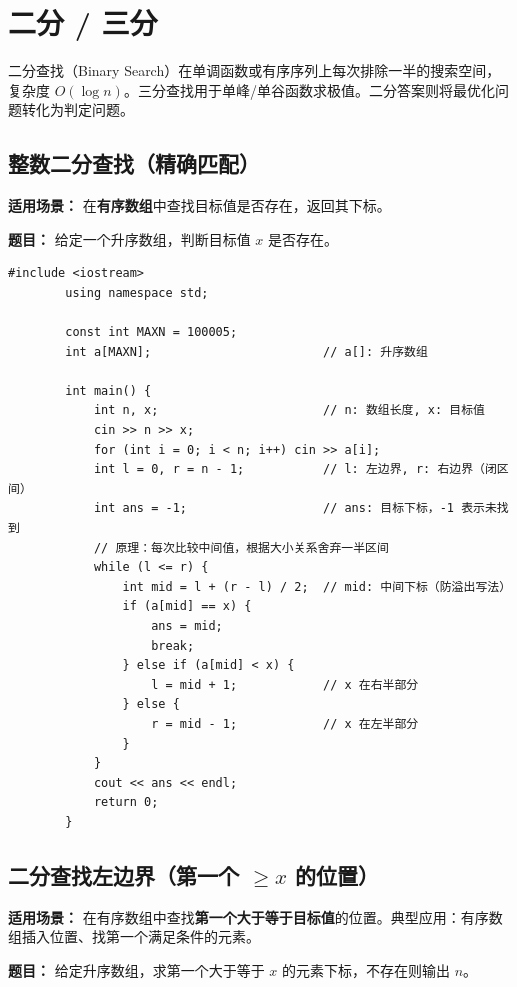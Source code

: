 \documentclass[12pt,a4paper]{ctexart}
\begin{document}
	\newpage
	
	\section{二分 / 三分}
	二分查找（Binary Search）在单调函数或有序序列上每次排除一半的搜索空间，复杂度 \(O(\log n)\)。三分查找用于单峰/单谷函数求极值。二分答案则将最优化问题转化为判定问题。
	
	\subsection{整数二分查找（精确匹配）}
	\textbf{适用场景：} 在\textbf{有序数组}中查找目标值是否存在，返回其下标。
	
	\textbf{题目：} 给定一个升序数组，判断目标值 \(x\) 是否存在。
	
	\begin{lstlisting}[caption={整数二分——查找目标值}]
		#include <iostream>
		using namespace std;
		
		const int MAXN = 100005;
		int a[MAXN];                        // a[]: 升序数组
		
		int main() {
			int n, x;                       // n: 数组长度, x: 目标值
			cin >> n >> x;
			for (int i = 0; i < n; i++) cin >> a[i];
			int l = 0, r = n - 1;           // l: 左边界, r: 右边界（闭区间）
			int ans = -1;                   // ans: 目标下标，-1 表示未找到
			// 原理：每次比较中间值，根据大小关系舍弃一半区间
			while (l <= r) {
				int mid = l + (r - l) / 2;  // mid: 中间下标（防溢出写法）
				if (a[mid] == x) {
					ans = mid;
					break;
				} else if (a[mid] < x) {
					l = mid + 1;            // x 在右半部分
				} else {
					r = mid - 1;            // x 在左半部分
				}
			}
			cout << ans << endl;
			return 0;
		}
	\end{lstlisting}
	
	\subsection{二分查找左边界（第一个 \(\ge x\) 的位置）}
	\textbf{适用场景：} 在有序数组中查找\textbf{第一个大于等于目标值}的位置。典型应用：有序数组插入位置、找第一个满足条件的元素。
	
	\textbf{题目：} 给定升序数组，求第一个大于等于 \(x\) 的元素下标，不存在则输出 \(n\)。
	
\end{document}
